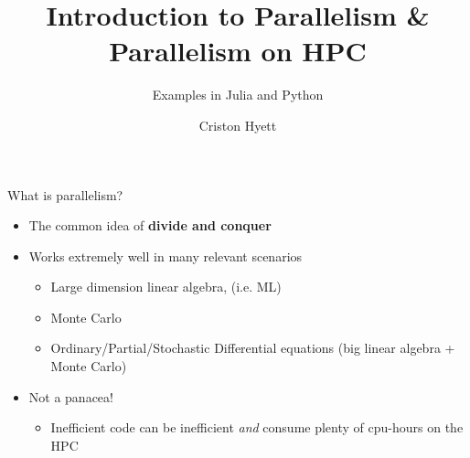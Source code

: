 \documentclass[dvipsnames,pdf,9pt]{beamer}
\title{Introduction to Parallelism \& Parallelism on HPC}
\subtitle{Examples in Julia and Python}
\author[cmhyett@math.arizona.edu]{Criston Hyett}
\newcommand{\<}{\langle}
\renewcommand{\>}{\rangle}
\begin{document}
\graphicspath{{./figures/}}
\begin{frame}
  \titlepage
\end{frame}

\begin{frame}{What is parallelism?}
  \begin{itemize}
  \item The common idea of \textbf{divide and conquer}
  \item Works extremely well in many relevant scenarios
    \begin{itemize}
    \item Large dimension linear algebra, (i.e. ML)
    \item Monte Carlo
    \item Ordinary/Partial/Stochastic Differential equations (big linear algebra + Monte Carlo)
    \end{itemize}
  \item Not a panacea!
    \begin{itemize}
    \item Inefficient code can be inefficient \textit{and} consume plenty of cpu-hours on the HPC
    \end{itemize}
  \end{itemize}
\end{frame}
\end{document}
